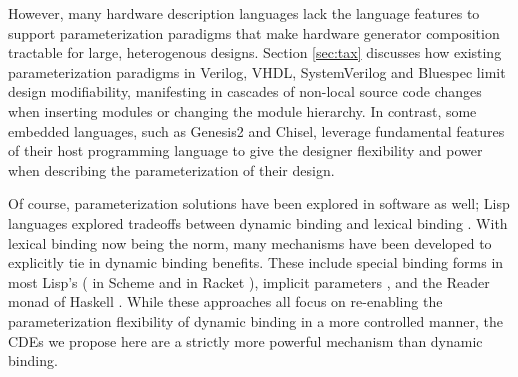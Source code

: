 However, many hardware description languages lack the language features to support parameterization paradigms that make hardware generator composition tractable for large, heterogenous designs. Section \ref{sec:tax} discusses how existing parameterization paradigms in Verilog, VHDL, SystemVerilog and Bluespec limit  design modifiability, manifesting in cascades of non-local source code changes when inserting modules or changing the module hierarchy. In contrast, some embedded languages, such as Genesis2\cite{genesis2} and Chisel\cite{chisel}, leverage fundamental features of their host programming language to give the designer flexibility and power when describing the parameterization of their design.


Of course, parameterization solutions have been explored in software as well; Lisp languages explored tradeoffs between dynamic binding %
and lexical binding %
\cite{gordon}. With lexical binding now being the norm, many mechanisms have been developed to explicitly tie in dynamic binding benefits. These include special binding forms in most Lisp's ( in Scheme \cite{steele} and  in Racket \cite{flatt2013racket}), implicit parameters \cite{lewis2000implicit}, and the Reader monad of Haskell \cite{jones1995functional}.
While these approaches all focus on re-enabling the parameterization flexibility of dynamic binding in a more controlled manner, 
the CDEs we propose here are a strictly more
powerful mechanism than dynamic binding. 

